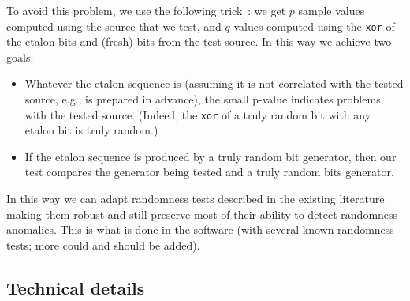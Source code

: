 \documentclass[12pt,a4paper,fullpage]{article}
\begin{document}
To avoid this problem, we use the following trick~\cite{shen-robust}: we get $p$ sample values computed using the source that we test, and $q$ values computed using the \texttt{xor} of the etalon bits and (fresh) bits from the test source. In this way we achieve two goals:
\begin{itemize}
\item Whatever the etalon sequence is (assuming it is not correlated with the tested source, e.g., is prepared in advance), the small p-value indicates problems with the tested source. (Indeed,  the \texttt{xor} of a truly random bit with any etalon bit is truly random.)
\item If the etalon sequence is produced by a truly random bit generator, then our test compares the generator being tested and  a truly random bits generator.
\end{itemize} 
In this way we can adapt randomness tests described in the existing literature making them robust and still preserve most of their ability to detect randomness anomalies. This is what is done in the software (with several known randomness tests; more could and should be added).

\subsection{Technical details}
\end{document}
